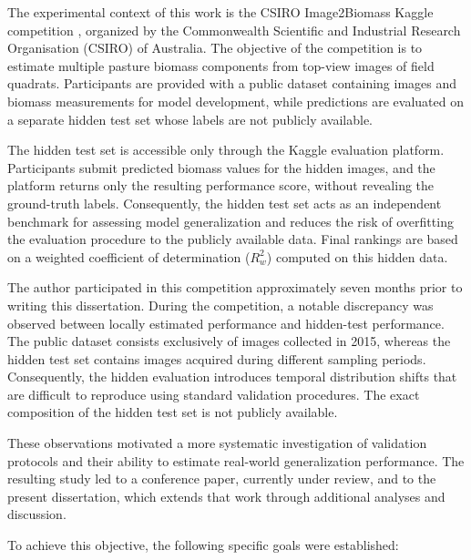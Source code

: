 The experimental context of this work is the CSIRO Image2Biomass Kaggle competition \cite{csiro-biomass}, organized by the Commonwealth Scientific and Industrial Research Organisation (CSIRO) of Australia. The objective of the competition is to estimate multiple pasture biomass components from top-view images of field quadrats. Participants are provided with a public dataset containing images and biomass measurements for model development, while predictions are evaluated on a separate hidden test set whose labels are not publicly available. 

The hidden test set is accessible only through the Kaggle evaluation platform. Participants submit predicted biomass values for the hidden images, and the platform returns only the resulting performance score, without revealing the ground-truth labels. Consequently, the hidden test set acts as an independent benchmark for assessing model generalization and reduces the risk of overfitting the evaluation procedure to the publicly available data. Final rankings are based on a weighted coefficient of determination ($R^2_w$) computed on this hidden data.

The author participated in this competition approximately seven months prior to writing this dissertation. During the competition, a notable discrepancy was observed between locally estimated performance and hidden-test performance. The public dataset consists exclusively of images collected in 2015, whereas the hidden test set contains images acquired during different sampling periods. Consequently, the hidden evaluation introduces temporal distribution shifts that are difficult to reproduce using standard validation procedures. The exact composition of the hidden test set is not publicly available.

These observations motivated a more systematic investigation of validation protocols and their ability to estimate real-world generalization performance. The resulting study led to a conference paper, currently under review, and to the present dissertation, which extends that work through additional analyses and discussion.

To achieve this objective, the following specific goals were established:

